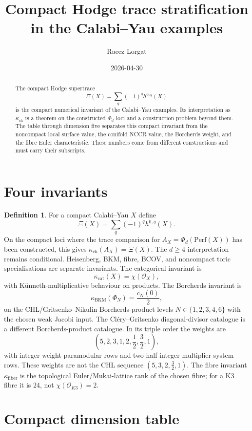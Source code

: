 \documentclass[11pt]{amsart}
\title[Compact Hodge trace stratification]{Compact Hodge trace
stratification in the Calabi--Yau examples}
\author{Raeez Lorgat}
\date{2026-04-30}
\providecommand{\cO}{\mathcal{O}}
\providecommand{\Perf}{\mathrm{Perf}}
\theoremstyle{definition}
\newtheorem{definition}[theorem]{Definition}
\theoremstyle{remark}
\begin{document}
\begin{abstract}
The compact Hodge supertrace
\[
        \Xi(X)=\sum_q(-1)^q h^{0,q}(X)
\]
is the compact numerical invariant of the Calabi--Yau examples. Its
interpretation as \(\kappa_{\mathrm{ch}}\) is a theorem on the constructed
\(\Phi_d\)-loci and a construction problem beyond them. The table through
dimension five separates this compact invariant from the noncompact local
surface value, the conifold NCCR value, the Borcherds weight, and the fibre
Euler characteristic. These numbers come from different constructions and
must carry their subscripts.
\end{abstract}
\maketitle

\section{Four invariants}

\begin{definition}
For a compact Calabi--Yau \(X\) define
\[
        \Xi(X)=\sum_q(-1)^q h^{0,q}(X).
\]
On the compact loci where the trace comparison for
\(A_X=\Phi_d(\Perf(X))\) has been constructed, this gives
\(\kappa_{\mathrm{ch}}(A_X)=\Xi(X)\). The \(d\geq4\) interpretation remains
conditional. Heisenberg, BKM, fibre, BCOV, and noncompact toric
specialisations are separate invariants. The
categorical invariant is
\[
        \kappa_{\mathrm{cat}}(X)=\chi(\cO_X),
\]
with K\"unneth-multiplicative behaviour on products. The Borcherds invariant
is
\[
        \kappa_{\mathrm{BKM}}(\Phi_N)=\frac{c_N(0)}{2},
\]
on the CHL/Gritsenko--Nikulin Borcherds-product levels
\(N\in\{1,2,3,4,6\}\) with the chosen weak Jacobi input. The
Cl\'ery--Gritsenko diagonal-divisor catalogue is a different
Borcherds-product catalogue. In its triple order the weights are
\[
        \left(5,2,3,1,2,\frac12,\frac32,1\right),
\]
with integer-weight paramodular rows and two half-integer multiplier-system
rows. These weights are not the CHL sequence \((5,3,2,\tfrac32,1)\). The fibre
invariant \(\kappa_{\mathrm{fiber}}\) is the topological Euler/Mukai-lattice
rank of the chosen fibre; for a K3 fibre it is \(24\), not
\(\chi(\cO_{K3})=2\).
\end{definition}

\section{Compact dimension table}
\end{document}
